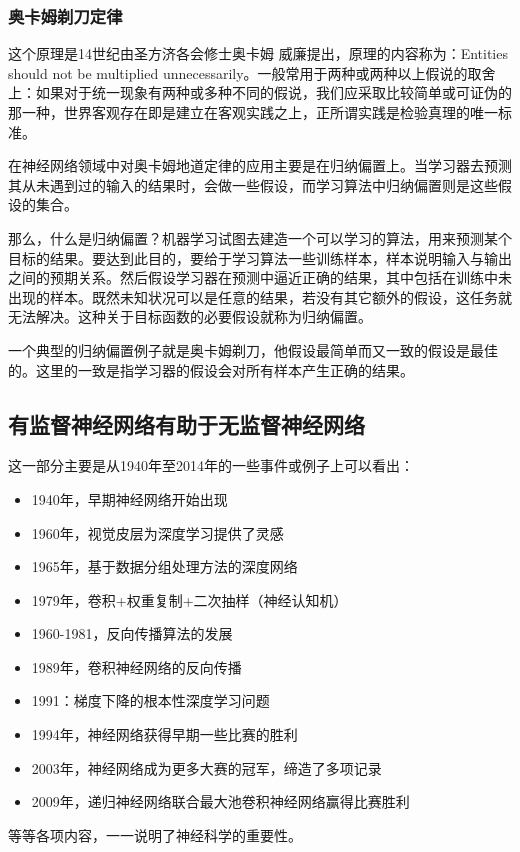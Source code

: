 \documentclass[10pt,journal,compsoc]{IEEEtran}
\begin{document}
\subsubsection{奥卡姆剃刀定律}
这个原理是14世纪由圣方济各会修士奥卡姆 威廉提出，原理的内容称为：Entities should not be multiplied unnecessarily。一般常用于两种或两种以上假说的取舍上：如果对于统一现象有两种或多种不同的假说，我们应采取比较简单或可证伪的那一种，世界客观存在即是建立在客观实践之上，正所谓实践是检验真理的唯一标准。\par
在神经网络领域中对奥卡姆地道定律的应用主要是在归纳偏置上。当学习器去预测其从未遇到过的输入的结果时，会做一些假设，而学习算法中归纳偏置则是这些假设的集合。\par
那么，什么是归纳偏置？机器学习试图去建造一个可以学习的算法，用来预测某个目标的结果。要达到此目的，要给于学习算法一些训练样本，样本说明输入与输出之间的预期关系。然后假设学习器在预测中逼近正确的结果，其中包括在训练中未出现的样本。既然未知状况可以是任意的结果，若没有其它额外的假设，这任务就无法解决。这种关于目标函数的必要假设就称为归纳偏置。\par
一个典型的归纳偏置例子就是奥卡姆剃刀，他假设最简单而又一致的假设是最佳的。这里的一致是指学习器的假设会对所有样本产生正确的结果。

\subsection{有监督神经网络有助于无监督神经网络}
这一部分主要是从1940年至2014年的一些事件或例子上可以看出：
\begin{itemize}
\item 1940年，早期神经网络开始出现
\item 1960年，视觉皮层为深度学习提供了灵感
\item 1965年，基于数据分组处理方法的深度网络
\item 1979年，卷积+权重复制+二次抽样（神经认知机）
\item 1960-1981，反向传播算法的发展
\item 1989年，卷积神经网络的反向传播
\item 1991：梯度下降的根本性深度学习问题
\item 1994年，神经网络获得早期一些比赛的胜利
\item 2003年，神经网络成为更多大赛的冠军，缔造了多项记录
\item 2009年，递归神经网络联合最大池卷积神经网络赢得比赛胜利
\end{itemize}
等等各项内容，一一说明了神经科学的重要性。
\end{document}
